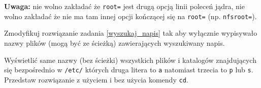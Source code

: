 \textbf{Uwaga:} nie wolno zakładać że \Verb#root=# jest drugą opcją linii poleceń jądra, nie wolno zakładać że nie ma tam innej opcji kończącej się na \Verb#root=# (np. \Verb#nfsroot=#).
\fi



\dbEntryCheckResults
Zmodyfikuj rozwiązanie zadania \ref{wyszukaj_napis} tak aby wyłącznie wypisywało nazwy plików (mogą być ze ścieżką) zawierających wyszukiwany napis.
\fi

\dbEntryCheckResults
Wyświetlić same nazwy (bez ścieżki) wszystkich plików i katalogów znajdujących się bezpośrednio w \texttt{/etc/} których druga litera to \texttt{a} natomiast trzecia to \texttt{p} lub \texttt{s}.
Przedstaw rozwiązanie z użyciem i bez użycia komendy \texttt{cd}.
\fi
